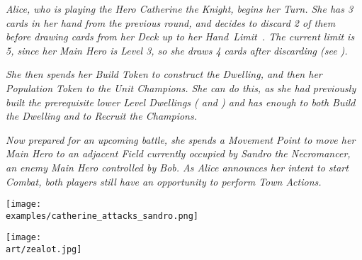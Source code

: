 \begin{multicols}{2}
\textit{Alice, who is playing the Hero Catherine the Knight, begins her Turn.
She has 3 cards in her hand from the previous round, and decides to discard 2 of them before drawing cards from her Deck up to her \mbox{Hand Limit .}
The current limit is 5, since her Main Hero is Level 3, so she draws 4 cards after discarding (see ).}\par
\textit{She then spends her Build Token to construct the  Dwelling, and then her Population Token to  the  Unit Champions.
She can do this, as she had previously built the prerequisite lower Level Dwellings ( and ) and has enough  to both Build the Dwelling and to Recruit the Champions.}\par
\textit{Now prepared for an upcoming battle, she spends a Movement Point to move her Main Hero to an adjacent Field currently occupied by Sandro the Necromancer, an enemy Main Hero controlled by Bob.
As Alice announces her intent to start Combat, both players still have an opportunity to perform Town Actions.}\par

\texttt{[image: \\examples/catherine\_attacks\_sandro.png]}

\end{multicols}

\vfill

\begin{center}
  \texttt{[image: \\art/zealot.jpg]}
\end{center}
